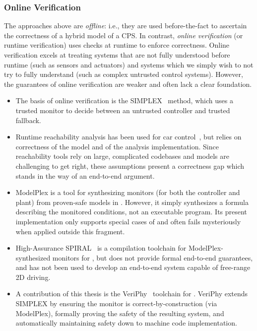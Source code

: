 \documentclass[12pt]{cmuthesis}
\theoremstyle{definition}
\theoremstyle{remark}
\newcommand{\VeriPhy}{VeriPhy\xspace}
\newcommand{\ModelPlex}{ModelPlex\xspace}
\begin{document}
\subsubsection{Online Verification}
The approaches above are \emph{offline}: i.e., they are used before-the-fact to ascertain the correctness of a hybrid model of a CPS.
In contrast, \emph{online verification} (or runtime verification) uses checks at runtime to enforce correctness.
Online verification excels at treating systems that are not fully understood before runtime (such as sensors and actuators) and systems which we simply wish to not try to fully understand (such as complex untrusted control systems).
However, the guarantees of online verification are weaker and often lack a clear foundation.
\begin{itemize}
\item The basis of online verification is the SIMPLEX~\cite{Krogh1998TheSA} method, which uses a trusted monitor to decide between an untrusted controller and trusted fallback.
\item Runtime reachability analysis has been used for car control~\cite{DBLP:journals/trob/AlthoffD14}, but relies on correctness of the model and of the analysis implementation.
Since reachability tools rely on large, complicated codebases and models are challenging to get right, these assumptions present a correctness gap which stands in the way of an end-to-end argument.
\item \ModelPlex is a tool for synthesizing monitors (for both the controller and plant) from proven-safe \dL models in \KeYmaeraX.
  However, it simply synthesizes a \dL formula describing the monitored conditions, not an executable program.
  Its present implementation only supports special cases of \dL and often fails mysteriously when applied outside this fragment.
\item High-Assurance SPIRAL~\cite{DBLP:journals/csm/FranchettiLMMGPPKMFJPV17} is a compilation toolchain for \ModelPlex-synthesized monitors for \dL, but does not provide formal end-to-end guarantees, and has not been used to develop an end-to-end system capable of free-range 2D driving.
\item A contribution of this thesis is the \VeriPhy~\cite{DBLP:conf/pldi/BohrerTMMP18} toolchain for \dL.
  \VeriPhy extends SIMPLEX by ensuring the monitor is correct-by-construction (via \ModelPlex), formally proving the safety of the resulting system, and automatically maintaining safety down to machine code implementation.
\end{itemize}
\end{document}
